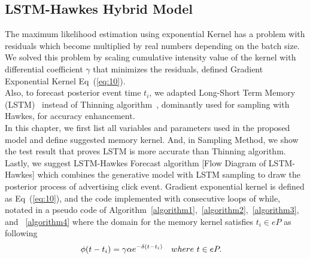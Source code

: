 \documentclass[10pt,letterpaper]{article}
\begin{document}
\subsection*{LSTM-Hawkes Hybrid Model}
The maximum likelihood estimation using exponential Kernel has a problem with residuals which become multiplied by real numbers depending on the batch size. We solved this problem by scaling cumulative intensity value of the kernel with differential coefficient $\gamma$ that minimizes the residuals, defined Gradient Exponential Kernel Eq~(\ref{eq:10}).\\ 
Also, to forecast posterior event time $t_i$, we adapted Long-Short Term Memory (LSTM)~\cite{bib15} instead of Thinning algorithm~\cite{bib16}, dominantly used for sampling with Hawkes, for accuracy enhancement.\\ In this chapter, we first list all variables and parameters used in the proposed model and define suggested memory kernel. And, in Sampling Method, we show the test result that proves LSTM is more accurate than Thinning algorithm. Lastly, we suggest LSTM-Hawkes Forecast algorithm [Flow Diagram of LSTM-Hawkes] which combines the generative model with LSTM sampling to draw the posterior process of advertising click event.
Gradient exponential kernel is defined as Eq~(\ref{eq:10}), and the code implemented with consecutive loops of while, notated in a pseudo code of Algorithm~\ref{algorithm1},~\ref{algorithm2},~\ref{algorithm3}, and ~\ref{algorithm4} where the domain for the memory kernel satisfies $t_i \in  eP$ as following
\begin{align}
\label{eq:8}
\centering
\phi(t-t_i)&=\gamma \alpha e^{-\delta(t-t_i)} \quad where\ t \in eP. 
\end{align}   
\end{document}
